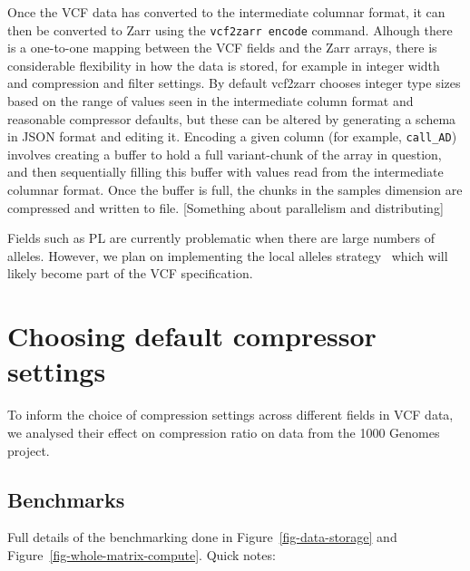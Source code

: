 \documentclass[a4paper,num-refs]{oup-contemporary}
\begin{document}
Once the VCF data has converted to the intermediate columnar format,
it can then be converted to Zarr using the \texttt{vcf2zarr encode}
command. Alhough there is a one-to-one mapping between the VCF
fields and the Zarr arrays, there is considerable flexibility 
in how the data is stored, for example in integer width
and compression and filter settings.
By default vcf2zarr chooses integer type sizes based 
on the range of values seen in the intermediate column format
and reasonable compressor defaults, but these can be
altered by generating a schema in JSON format and editing it.
Encoding a given column (for example, \texttt{call\_AD})
involves creating a buffer to hold a full variant-chunk of the 
array in question, and then sequentially filling this buffer with 
values read from the intermediate columnar format. Once the buffer 
is full, the chunks in the samples dimension are compressed
and written to file. [Something about parallelism and distributing]

Fields such as PL are currently problematic when there are large 
numbers of alleles. However, we plan on implementing the 
local alleles strategy~\citep{poterba2024scalable,danecek2021twelve}
which will likely become part of the VCF specification.

\section{Choosing default compressor settings}
To inform the choice of compression settings across different fields 
in VCF data, we analysed their effect on compression ratio on 
data from the 1000 Genomes project.


\subsection{Benchmarks}
Full details of the benchmarking done in
Figure~\ref{fig-data-storage} and
Figure~\ref{fig-whole-matrix-compute}.
Quick notes:
\end{document}
